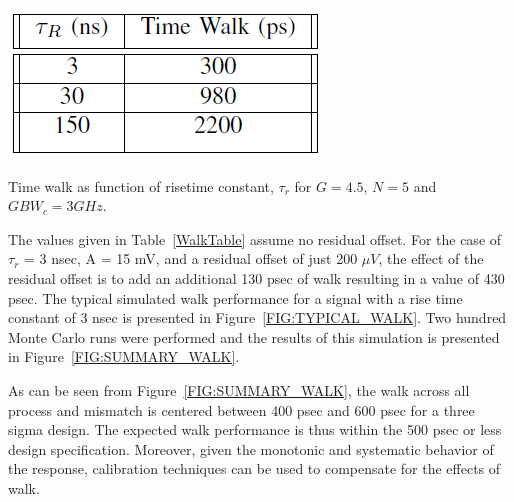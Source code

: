 \documentclass[12pt,oneside,final]{siuethesis}
\theoremstyle{definition}
\begin{document}
\begin{table}[htbp!]
 \centering
 \includegraphics[scale=.7,keepaspectratio=true]{./ch4_figures/walk_table.png}
\caption{Time walk as function of risetime constant, $\tau_r$ for $G = 4.5$, $N = 5$ and $GBW_{c} = 3 GHz$.}
\label{WalkTable}
\end{table}

\par The values given in Table~\ref{WalkTable} assume no residual offset.  For the case of $\tau_r$ = 3 nsec, A = 15 mV, and a residual offset of just 200 $\mu V$, the effect of the residual offset is to add an additional 130 psec of walk resulting in a value of 430 psec. The typical simulated walk performance for a signal with a rise time constant of 3 nsec is presented in Figure~\ref{FIG:TYPICAL_WALK}.  Two hundred Monte Carlo runs were performed and the results of this simulation is presented in Figure~\ref{FIG:SUMMARY_WALK}. 

\par As can be seen from Figure~\ref{FIG:SUMMARY_WALK}, the walk across all process and mismatch is centered between 400 psec and 600 psec for a three sigma design. The expected walk performance is thus within the 500 psec or less design specification. Moreover, given the monotonic and systematic behavior of the response, calibration techniques can be used to compensate for the effects of walk. 
\end{document}
